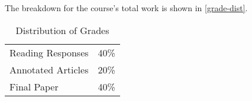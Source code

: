 \documentclass[titlepage]{article}
\newcommand\policy{../policy}
\begin{document}
The breakdown for the course's total work is shown in
\autoref{grade-dist}.

\begin{table}[htbp]
  \centering
  {\lining
  \begin{tabular}{lr}
    \toprule
    Reading Responses  & 40\% \\
    Annotated Articles & 20\% \\
    Final Paper        & 40\% \\
    \bottomrule
  \end{tabular}}
  \caption{Distribution of Grades}
  \label{grade-dist}
\end{table}



\end{document}
